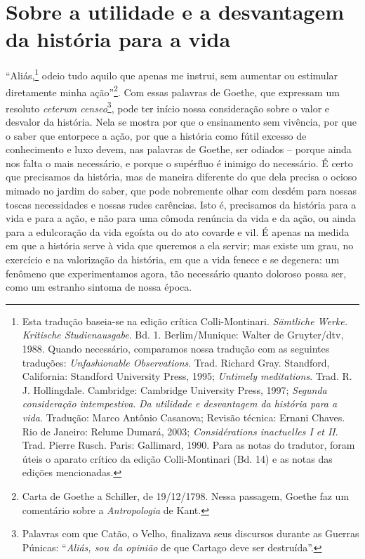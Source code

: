 
\part{Sobre a utilidade e a desvantagem da história para a vida}



\label{prefuxe1cio}

``Aliás,\footnote{Esta tradução baseia-se na edição crítica
  Colli-Montinari. \emph{Sämtliche Werke. Kritische Studienausgabe}. Bd.
  1. Berlim/Munique: Walter de Gruyter/dtv, 1988. Quando necessário,
  comparamos nossa tradução com as seguintes traduções:
  \emph{Unfashionable Observations}. Trad. Richard Gray. Standford,
  California: Standford University Press, 1995; \emph{Untimely
  meditations}. Trad. R. J. Hollingdale. Cambridge: Cambridge University
  Press, 1997; \emph{Segunda consideração intempestiva}. \emph{Da
  utilidade e desvantagem da história para a vida.} Tradução: Marco
  Antônio Casanova; Revisão técnica: Ernani Chaves. Rio de Janeiro:
  Relume Dumará, 2003; \emph{Considérations inactuelles I et II}. Trad.
  Pierre Rusch. Paris: Gallimard, 1990. Para as notas do tradutor, foram
  úteis o aparato crítico da edição Colli-Montinari (Bd. 14) e as notas
  das edições mencionadas.} odeio tudo aquilo que apenas me instrui, sem
aumentar ou estimular diretamente minha ação''\footnote{Carta de Goethe
  a Schiller, de 19/12/1798. Nessa passagem, Goethe faz um comentário
  sobre a \emph{Antropologia} de Kant.}. Com essas palavras de Goethe,
que expressam um resoluto \emph{ceterum censeo}\footnote{Palavras com
  que Catão, o Velho, finalizava seus discursos durante as Guerras
  Púnicas: ``\emph{Aliás, sou da opinião} de que Cartago deve ser
  destruída''.}, pode ter início nossa consideração sobre o valor e
desvalor da história. Nela se mostra por que o ensinamento sem vivência,
por que o saber que entorpece a ação, por que a história como fútil
excesso de conhecimento e luxo devem, nas palavras de Goethe, ser odiados
-- porque ainda nos falta o mais necessário, e porque o supérfluo é
inimigo do necessário. É certo que precisamos da história, mas de
maneira diferente do que dela precisa o ocioso mimado no jardim do
saber, que pode nobremente olhar com desdém para nossas toscas
necessidades e nossas rudes carências. Isto é, precisamos da história
para a vida e para a ação, e não para uma cômoda renúncia da vida e da
ação, ou ainda para a edulcoração da vida egoísta ou do ato covarde e
vil. É apenas na medida em que a história serve à vida que queremos a
ela servir; mas existe um grau, no exercício e na valorização da história,
em que a vida fenece e se degenera: um fenômeno que experimentamos
agora, tão necessário quanto doloroso possa ser, como um estranho
sintoma de nossa época.

